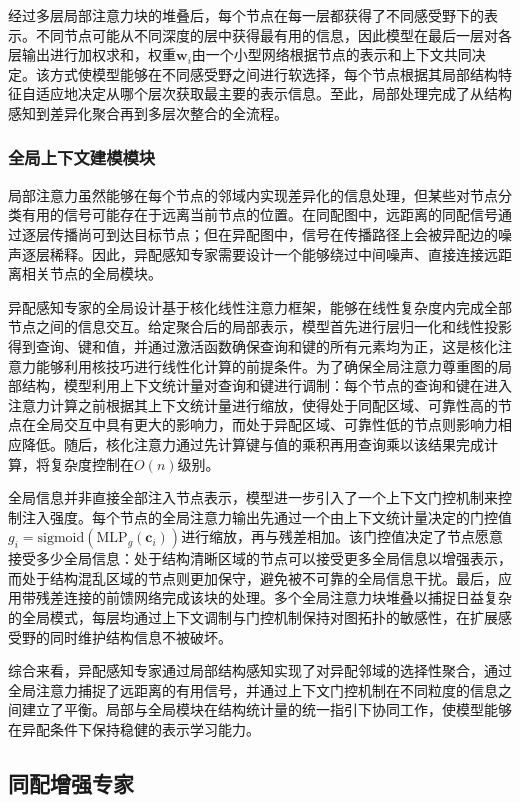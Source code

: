 \documentclass[a4paper,10pt]{article}
\begin{document}
经过多层局部注意力块的堆叠后，每个节点在每一层都获得了不同感受野下的表示。不同节点可能从不同深度的层中获得最有用的信息，因此模型在最后一层对各层输出进行加权求和，权重$\mathbf{w}_i$由一个小型网络根据节点的表示和上下文共同决定。该方式使模型能够在不同感受野之间进行软选择，每个节点根据其局部结构特征自适应地决定从哪个层次获取最主要的表示信息。至此，局部处理完成了从结构感知到差异化聚合再到多层次整合的全流程。

\subsubsection{全局上下文建模模块}

局部注意力虽然能够在每个节点的邻域内实现差异化的信息处理，但某些对节点分类有用的信号可能存在于远离当前节点的位置。在同配图中，远距离的同配信号通过逐层传播尚可到达目标节点；但在异配图中，信号在传播路径上会被异配边的噪声逐层稀释。因此，异配感知专家需要设计一个能够绕过中间噪声、直接连接远距离相关节点的全局模块。

异配感知专家的全局设计基于核化线性注意力框架，能够在线性复杂度内完成全部节点之间的信息交互。给定聚合后的局部表示，模型首先进行层归一化和线性投影得到查询、键和值，并通过激活函数确保查询和键的所有元素均为正，这是核化注意力能够利用核技巧进行线性化计算的前提条件。为了确保全局注意力尊重图的局部结构，模型利用上下文统计量对查询和键进行调制：每个节点的查询和键在进入注意力计算之前根据其上下文统计量进行缩放，使得处于同配区域、可靠性高的节点在全局交互中具有更大的影响力，而处于异配区域、可靠性低的节点则影响力相应降低。随后，核化注意力通过先计算键与值的乘积再用查询乘以该结果完成计算，将复杂度控制在$O(n)$级别。

全局信息并非直接全部注入节点表示，模型进一步引入了一个上下文门控机制来控制注入强度。每个节点的全局注意力输出先通过一个由上下文统计量决定的门控值$g_i=\text{sigmoid}(\text{MLP}_g(\mathbf{c}_i))$进行缩放，再与残差相加。该门控值决定了节点愿意接受多少全局信息：处于结构清晰区域的节点可以接受更多全局信息以增强表示，而处于结构混乱区域的节点则更加保守，避免被不可靠的全局信息干扰。最后，应用带残差连接的前馈网络完成该块的处理。多个全局注意力块堆叠以捕捉日益复杂的全局模式，每层均通过上下文调制与门控机制保持对图拓扑的敏感性，在扩展感受野的同时维护结构信息不被破坏。

综合来看，异配感知专家通过局部结构感知实现了对异配邻域的选择性聚合，通过全局注意力捕捉了远距离的有用信号，并通过上下文门控机制在不同粒度的信息之间建立了平衡。局部与全局模块在结构统计量的统一指引下协同工作，使模型能够在异配条件下保持稳健的表示学习能力。

\subsection{同配增强专家}
\end{document}
